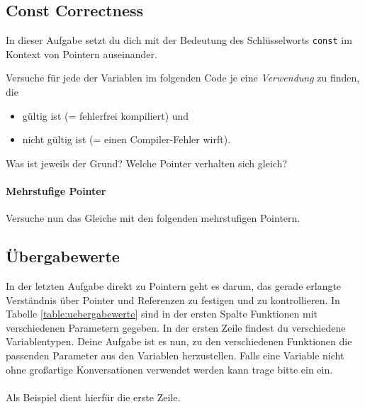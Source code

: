 \subsection{Const Correctness}

In dieser Aufgabe setzt du dich mit der Bedeutung des Schlüsselworts \lstinline{const} im Kontext von Pointern auseinander.

Versuche für jede der Variablen im folgenden Code je eine \emph{Verwendung} zu finden, die  
\begin{itemize}
\item gültig ist (= fehlerfrei kompiliert) und
\item nicht gültig ist (= einen Compiler-Fehler wirft).
\end{itemize}


Was ist jeweils der Grund?
Welche Pointer verhalten sich gleich?


\paragraph{Mehrstufige Pointer}

Versuche nun das Gleiche mit den folgenden mehrstufigen Pointern.


\subsection{Übergabewerte}
In der letzten Aufgabe direkt zu Pointern geht es darum, das gerade erlangte Verständnis über Pointer und Referenzen zu festigen und zu kontrollieren.
In Tabelle \ref{table:uebergabewerte} sind in der ersten Spalte Funktionen mit verschiedenen Parametern gegeben.
In der ersten Zeile findest du verschiedene Variablentypen.
Deine Aufgabe ist es nun, zu den verschiedenen Funktionen die passenden Parameter aus den Variablen herzustellen.
Falls eine Variable nicht ohne großartige Konversationen verwendet werden kann trage bitte ein \xmark ein. \\\\
Als Beispiel dient hierfür die erste Zeile. 


